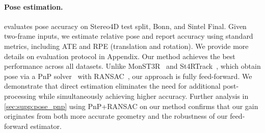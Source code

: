 \begin{table}[t]
\centering
\scriptsize
\setlength\tabcolsep{3pt}
\caption{\textbf{Pose estimation.}
We report standard metrics, ATE and RPE translation ($\text{RPE}_\text{trans}$) and rotation ($\text{RPE}_\text{rot}$) for pose estimation on Stereo4D test, Bonn, and Sintel final,
Our feed-forward approach outperforms methods relying on iterative solvers (\eg MonST3R, St4RTrack) on all metrics.}
\label{tab:exp:pose}
\newcolumntype{Y}{S[table-format=2.4, round-mode=places, round-precision=4]}
\newcolumntype{Z}{S[table-format=2.3, round-mode=places, round-precision=3]}
\end{table}



\paragraph{Pose estimation.}
 evaluates pose accuracy on Stereo4D test split, Bonn, and Sintel Final.
Given two-frame inputs, we estimate relative pose and report accuracy using standard metrics, including ATE and RPE (translation and rotation).
We provide more details on evaluation protocol in Appendix. 
Our method achieves the best performance across all datasets.
Unlike MonST3R~\citep{Zhang:2025:MST} and St4RTrack~\cite{Feng:2025:ST4}, which obtain pose via a PnP solver~\citep{Lepetit:2009:PNP} with RANSAC~\citep{Fischler:1981:RSC}, our approach is fully feed-forward. We demonstrate that direct estimation eliminates the need for additional post-processing while simultaneously achieving higher accuracy.
Further analysis in \cref{sec:supp:pose_pnp} using PnP+RANSAC on our method confirms that our gain originates from both more accurate geometry and the robustness of our feed-forward estimator.


